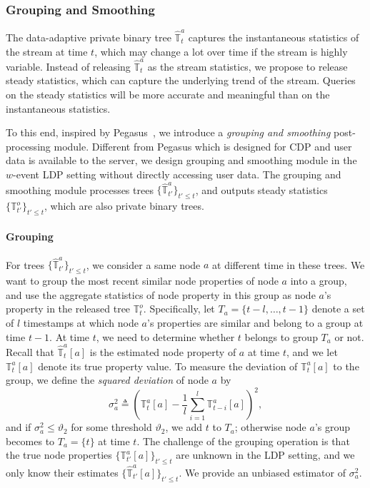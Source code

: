 \documentclass[acmsmall]{acmart}
\newcommand{\Tree}{\mathbb{T}}
\newcommand{\AT}{\Tree^a}
\newcommand{\hAT}{\hat{\Tree}^a}
\newcommand{\OT}{\Tree^o}
\begin{document}
\subsubsection{Grouping and Smoothing}
\label{ss:group_and_smooth}
The data-adaptive private binary tree $\hAT_t$ captures the instantaneous
statistics of the stream at time $t$, which may change a lot over time if the
stream is highly variable.
Instead of releasing $\hAT_t$ as the stream statistics, we propose to release
steady statistics, which can capture the underlying trend of the stream.
Queries on the steady statistics will be more accurate and meaningful than on
the instantaneous statistics.

To this end, inspired by Pegasus~\cite{Chen2017}, we introduce a \emph{grouping
  and smoothing} post-processing module.
Different from Pegasus which is designed for CDP and user data is available to
the server, we design grouping and smoothing module in the $w$-event LDP setting
without directly accessing user data.
The grouping and smoothing module processes trees $\{\hAT_{t'}\}_{t'\leq t}$,
and outputs steady statistics $\{\OT_{t'}\}_{t'\leq t}$, which are also private
binary trees.

\paragraph{Grouping}
For trees $\{\hAT_{t'}\}_{t'\leq t}$, we consider a same node $a$ at different
time in these trees.
We want to group the most recent similar node properties of node $a$ into a
group, and use the aggregate statistics of node property in this group as node
$a$'s property in the released tree $\OT_t$.
Specifically, let $T_a=\{t-l,\ldots,t-1\}$ denote a set of $l$ timestamps at
which node $a$'s properties are similar and belong to a group at time $t-1$.
At time $t$, we need to determine whether $t$ belongs to group $T_a$ or not.
Recall that $\hAT_t[a]$ is the estimated node property of $a$ at time $t$, and
we let $\AT_t[a]$ denote its true property value.
To measure the deviation of $\AT_t[a]$ to the group, we define the \emph{squared
  deviation} of node $a$ by
\[
  \sigma_a^2\triangleq (\AT_t[a] - \frac{1}{l}\sum_{i=1}^l\AT_{t-i}[a])^2,
\]
and if $\sigma_a^2\leq\vartheta_2$ for some threshold $\vartheta_2$, we add $t$ to
$T_a$; otherwise node $a$'s group becomes to $T_a=\{t\}$ at time $t$.
The challenge of the grouping operation is that the true node properties
$\{\AT_{t'}[a]\}_{t'\leq t}$ are unknown in the LDP setting, and we only know
their estimates $\{\hAT_{t'}[a]\}_{t'\leq t}$.
We provide an unbiased estimator of $\sigma_a^2$.
\end{document}
